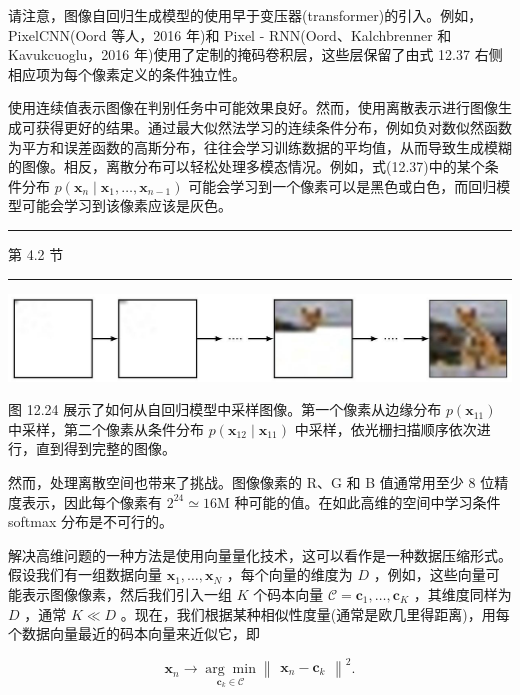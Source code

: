 \documentclass[10pt]{article}
\newcommand{\HRule}{\begin{center}\rule{0.9\linewidth}{0.2mm}\end{center}}
\begin{document}
请注意，图像自回归生成模型的使用早于变压器(transformer)的引入。例如，PixelCNN(Oord 等人，2016 年)和 Pixel - RNN(Oord、Kalchbrenner 和 Kavukcuoglu，2016 年)使用了定制的掩码卷积层，这些层保留了由式 12.37 右侧相应项为每个像素定义的条件独立性。

使用连续值表示图像在判别任务中可能效果良好。然而，使用离散表示进行图像生成可获得更好的结果。通过最大似然法学习的连续条件分布，例如负对数似然函数为平方和误差函数的高斯分布，往往会学习训练数据的平均值，从而导致生成模糊的图像。相反，离散分布可以轻松处理多模态情况。例如，式(12.37)中的某个条件分布 \(p\left( {{\mathbf{x}}_{n} \mid  {\mathbf{x}}_{1},\ldots ,{\mathbf{x}}_{n - 1}}\right)\) 可能会学习到一个像素可以是黑色或白色，而回归模型可能会学习到该像素应该是灰色。

\HRule

第 4.2 节

\HRule

\begin{center}
\includegraphics[max width=1.0\textwidth]{images/0194e279-9b28-703a-88f4-c3ac21e2010d_416_272_1666_1252_219_0.jpg}
\end{center}
\hspace*{3em} 

图 12.24 展示了如何从自回归模型中采样图像。第一个像素从边缘分布 \(p\left( {\mathbf{x}}_{11}\right)\) 中采样，第二个像素从条件分布 \(p\left( {{\mathbf{x}}_{12} \mid  {\mathbf{x}}_{11}}\right)\) 中采样，依光栅扫描顺序依次进行，直到得到完整的图像。

然而，处理离散空间也带来了挑战。图像像素的 R、G 和 B 值通常用至少 8 位精度表示，因此每个像素有 \({2}^{24} \simeq  {16}\mathrm{M}\) 种可能的值。在如此高维的空间中学习条件 softmax 分布是不可行的。

解决高维问题的一种方法是使用向量量化技术，这可以看作是一种数据压缩形式。假设我们有一组数据向量 \({\mathbf{x}}_{1},\ldots ,{\mathbf{x}}_{N}\) ，每个向量的维度为 \(D\) ，例如，这些向量可能表示图像像素，然后我们引入一组 \(K\) 个码本向量 \(\mathcal{C} = {\mathbf{c}}_{1},\ldots ,{\mathbf{c}}_{K}\) ，其维度同样为 \(D\) ，通常 \(K \ll  D\) 。现在，我们根据某种相似性度量(通常是欧几里得距离)，用每个数据向量最近的码本向量来近似它，即

\[
{\mathbf{x}}_{n} \rightarrow  \underset{{\mathbf{c}}_{k} \in  \mathcal{C}}{\arg \min }{\begin{Vmatrix}{\mathbf{x}}_{n} - {\mathbf{c}}_{k}\end{Vmatrix}}^{2}. \tag{12.38}
\]
\end{document}
